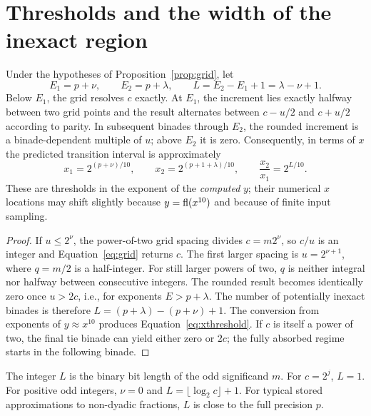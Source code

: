 \section{Thresholds and the width of the inexact region}
\begin{proposition}\label{prop:thresholds}
Under the hypotheses of Proposition~\ref{prop:grid}, let
\begin{equation}\label{eq:bounds}
 E_1=p+\nu,\qquad E_2=p+\lambda,\qquad
 L=E_2-E_1+1=\lambda-\nu+1.
\end{equation}
Below $E_1$, the grid resolves $c$ exactly. At $E_1$, the increment lies exactly halfway between two grid points and the result alternates between $c-u/2$ and $c+u/2$ according to parity. In subsequent binades through $E_2$, the rounded increment is a binade-dependent multiple of $u$; above $E_2$ it is zero. Consequently, in terms of $x$ the predicted transition interval is approximately
\begin{equation}\label{eq:xthreshold}
 x_1=2^{(p+\nu)/10},\qquad
 x_2=2^{(p+1+\lambda)/10},\qquad
 \frac{x_2}{x_1}=2^{L/10}.
\end{equation}
These are thresholds in the exponent of the \emph{computed} $y$; their numerical $x$ locations may shift slightly because $y=\operatorname{fl}(x^{10})$ and because of finite input sampling.
\end{proposition}
\begin{proof}
If $u\le2^{\nu}$, the power-of-two grid spacing divides $c=m2^{\nu}$, so $c/u$ is an integer and Equation~\eqref{eq:grid} returns $c$. The first larger spacing is $u=2^{\nu+1}$, where $q=m/2$ is a half-integer. For still larger powers of two, $q$ is neither integral nor halfway between consecutive integers. The rounded result becomes identically zero once $u>2c$, i.e., for exponents $E>p+\lambda$. The number of potentially inexact binades is therefore $L=(p+\lambda)-(p+\nu)+1$. The conversion from exponents of $y\approx x^{10}$ produces Equation~\eqref{eq:xthreshold}. If $c$ is itself a power of two, the final tie binade can yield either zero or $2c$; the fully absorbed regime starts in the following binade.
\end{proof}

The integer $L$ is the binary bit length of the odd significand $m$. For $c=2^j$, $L=1$. For positive odd integers, $\nu=0$ and $L=\lfloor\log_2 c\rfloor+1$. For typical stored approximations to non-dyadic fractions, $L$ is close to the full precision $p$.

